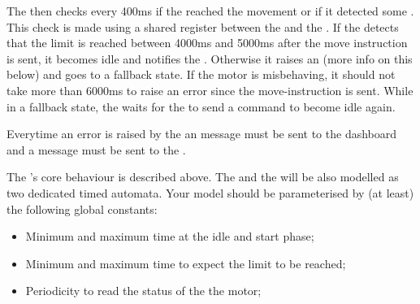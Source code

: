 \documentclass[11pt]{article}
\begin{document}
The  then checks every 400ms if the  reached the movement  or if it detected some . This check is made using a shared register between the  and the .
If the  detects that the limit is reached between 4000ms and 5000ms after the move instruction is sent, it becomes idle and notifies the . Otherwise it 
raises an  (more info on this below) and goes to a fallback state.
%
If the motor is misbehaving, it should not take more than 6000ms to raise an error since the move-instruction is sent.
While in a fallback state, the  waits for the  to send a  command to become idle again.


Everytime an error is raised by the 
an  message must be sent to the dashboard and
a  message must be sent to the .

The 's core behaviour is described above. The  and the  will be also modelled as two dedicated timed automata.
  Your model should be parameterised by (at least) the following global constants:
\begin{itemize}
  \item Minimum and maximum time at the idle and start phase;
  \item Minimum and maximum time to expect the limit to be reached;
  \item Periodicity to read the status of the the motor;
\end{itemize}
\end{document}
